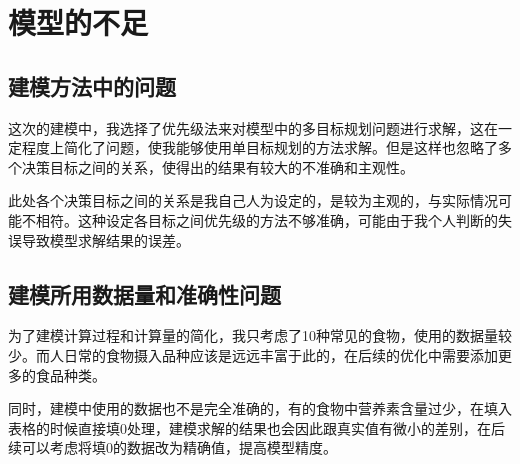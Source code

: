 \documentclass{SYSUReport}
\begin{document}
\section{模型的不足}

\subsection{建模方法中的问题}

这次的建模中，我选择了优先级法来对模型中的多目标规划问题进行求解，这在一定程度上简化了问题，使我能够使用单目标规划的方法求解。但是这样也忽略了多个决策目标之间的关系，使得出的结果有较大的不准确和主观性。

此处各个决策目标之间的关系是我自己人为设定的，是较为主观的，与实际情况可能不相符。这种设定各目标之间优先级的方法不够准确，可能由于我个人判断的失误导致模型求解结果的误差。

\subsection{建模所用数据量和准确性问题}

为了建模计算过程和计算量的简化，我只考虑了10种常见的食物，使用的数据量较少。而人日常的食物摄入品种应该是远远丰富于此的，在后续的优化中需要添加更多的食品种类。

同时，建模中使用的数据也不是完全准确的，有的食物中营养素含量过少，在填入表格的时候直接填0处理，建模求解的结果也会因此跟真实值有微小的差别，在后续可以考虑将填0的数据改为精确值，提高模型精度。



\clearpage
{}
{} %

\end{document}
